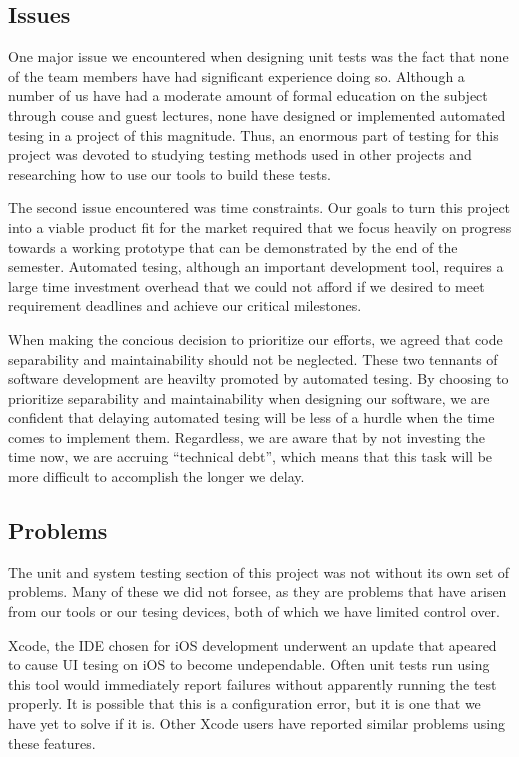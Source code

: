 \subsection{Issues}

One major issue we encountered when designing unit tests was the fact that none
of the team members have had significant experience doing so. Although a number
of us have had a moderate amount of formal education on the subject through
couse and guest lectures, none have designed or implemented automated tesing in
a project of this magnitude. Thus, an enormous part of testing for this project
was devoted to studying testing methods used in other projects and researching
how to use our tools to build these tests.

The second issue encountered was time constraints. Our goals to turn this
project into a viable product fit for the market required that we focus heavily
on progress towards a working prototype that can be demonstrated by the end of
the semester. Automated tesing, although an important development tool, requires
a large time investment overhead that we could not afford if we desired to meet
requirement deadlines and achieve our critical milestones.

When making the concious decision to prioritize our efforts, we agreed that code
separability and maintainability should not be neglected. These two tennants of
software development are heavilty promoted by automated tesing. By choosing to
prioritize separability and maintainability when designing our software, we are
confident that delaying automated tesing will be less of a hurdle when the time
comes to implement them. Regardless, we are aware that by not investing the time
now, we are accruing ``technical debt'', which means that this task will be more
difficult to accomplish the longer we delay.


\subsection{Problems}

The unit and system testing section of this project was not without its own set
of problems. Many of these we did not forsee, as they are problems that have
arisen from our tools or our tesing devices, both of which we have limited
control over.

Xcode, the IDE chosen for iOS development underwent an update that apeared to
cause UI tesing on iOS to become undependable. Often unit tests run using this
tool would immediately report failures without apparently running the test
properly. It is possible that this is a configuration error, but it is one that
we have yet to solve if it is. Other Xcode users have reported similar problems
using these features.

